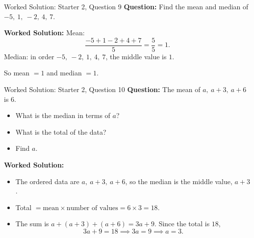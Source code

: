 \documentclass{beamer}
\begin{document}
\begin{frame}{Worked Solution: Starter 2, Question 9}
\small
\textbf{Question:} Find the mean and median of \(-5,\ 1,\ -2,\ 4,\ 7\).

\smallskip
\textbf{Worked Solution:} Mean:
\[
\frac{-5+1-2+4+7}{5}=\frac{5}{5}=1.
\]
Median: in order \(-5,\ -2,\ 1,\ 4,\ 7\), the middle value is \(1\).

So mean \(=1\) and median \(=1\).
\end{frame}

\begin{frame}{Worked Solution: Starter 2, Question 10}
\small
\textbf{Question:} The mean of \(a,\ a+3,\ a+6\) is \(6\).
\begin{itemize}
  \item What is the median in terms of \(a\)?
  \item What is the total of the data?
  \item Find \(a\).
\end{itemize}

\smallskip
\textbf{Worked Solution:}
\begin{itemize}
  \item The ordered data are \(a,\ a+3,\ a+6\), so the median is the middle value, \(a+3\).
  \item Total \(= \text{mean} \times \text{number of values} = 6 \times 3 = 18\).
  \item The sum is \(a+(a+3)+(a+6)=3a+9\). Since the total is \(18\),
  \[
  3a+9=18 \implies 3a=9 \implies a=3.
  \]
\end{itemize}
\end{frame}
\end{document}
